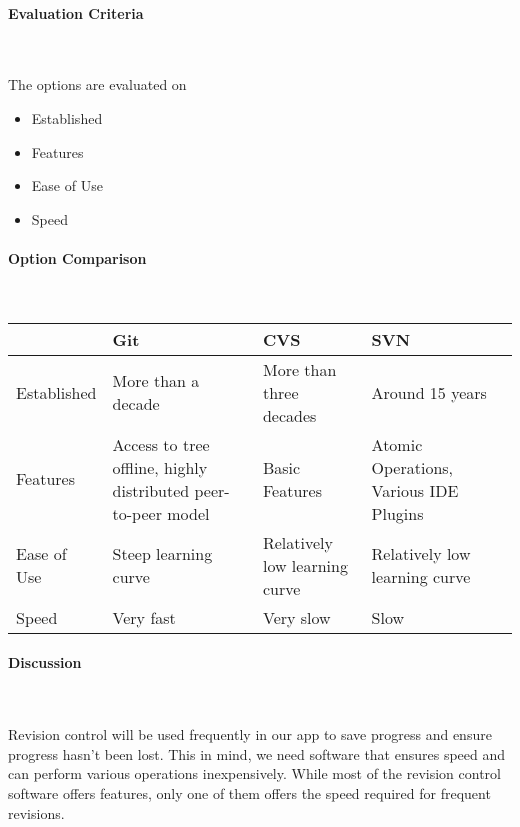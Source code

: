 \documentclass[letterpaper, 10pt, draftclsnofoot, compsoc, onecolumn]{IEEEtran}
\begin{document}
{\medskip
\newpage
\paragraph{Evaluation Criteria} ~\\
{\noindent The options are evaluated on 

\begin{itemize}
\item Established
\item Features
\item Ease of Use
\item Speed
\end{itemize}

 \par}


\newpage
\paragraph{Option Comparison} ~\\
\tablehead{}
\begin{supertabular}{|p{2cm}|p{2.5cm}|p{2.5cm}|p{2.5cm}|p{2.5cm}|}
\hline
& Git 
& CVS 
& SVN\\ \hline
Established & More than a decade & More than three decades & Around 15 years\\ \hline
Features & Access to tree offline, highly distributed peer-to-peer model & Basic Features & Atomic Operations, Various IDE Plugins \\ \hline
Ease of Use & Steep learning curve & Relatively low learning curve & Relatively low learning curve \\ \hline
Speed & Very fast & Very slow & Slow \\ \hline
\end{supertabular}

\medskip
{\noindent \cite{JaxEnter} \par}

\newpage
\paragraph{Discussion} ~\\
{\noindent Revision control will be used frequently in our app to save progress and ensure progress hasn't been lost. 
This in mind, we need software that ensures speed and can perform various operations inexpensively. 
While most of the revision control software offers features, only one of them offers the speed required for frequent revisions. \par}

}
\end{document}
